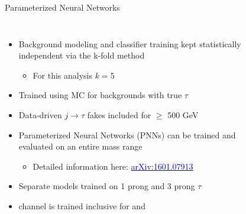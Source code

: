 \documentclass[aspectratio=169,xcolor=table]{beamer}
\begin{document}
    \begin{frame}[t]{Parameterized Neural Networks}
      \begin{columns}
      \begin{itemize}
      \small
      \item Background modeling and classifier training kept statistically independent via the k-fold method
      \begin{itemize}
        \item For this analysis $k=5$
      \end{itemize}
      \item Trained using MC for backgrounds with true $\tau$
      \item Data-driven $j \rightarrow \tau$ fakes included for $\geq$ 500 GeV 
      \item Parameterized Neural Networks (PNNs) can be trained and evaluated on an entire mass range
      \begin{itemize}
        \item Detailed information here: \href{https://arxiv.org/abs/1601.07913}{\textcolor{blue}{arXiv:1601.07913}}
      \end{itemize}
      \item Separate models trained on 1 prong and 3 prong $\tau$
      \item \taulep channel is trained inclusive for \tauel and \taumu
      \end{itemize}
      \footnotesize
      \centering      
      \begin{figure}
        \centering
        \begin{columns}

\end{columns}
\end{figure}
\end{columns}
\end{frame}
\end{document}
